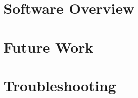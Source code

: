 \documentclass[letterpaper,12pt]{report}
\begin{document}
\pagebreak
\tableofcontents
\pagebreak

\chapter{Software Overview}
\label{cha:system-design-overview}

\chapter{Future Work}
\label{cha:future-work}

\chapter{Troubleshooting}
\label{cha:troubleshooting}
\end{document}
